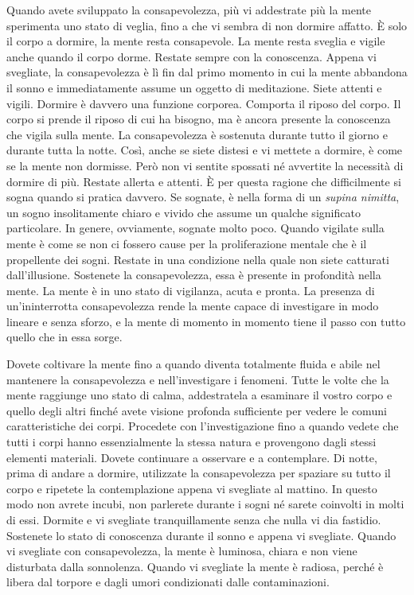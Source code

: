 Quando avete sviluppato la consapevolezza, più vi addestrate più la
mente sperimenta uno stato di veglia, fino a che vi sembra di non
dormire affatto. È solo il corpo a dormire, la mente resta consapevole.
La mente resta sveglia e vigile anche quando il corpo dorme. Restate
sempre con la conoscenza. Appena vi svegliate, la consapevolezza è lì
fin dal primo momento in cui la mente abbandona il sonno e
immediatamente assume un oggetto di meditazione. Siete attenti e vigili.
Dormire è davvero una funzione corporea. Comporta il riposo del corpo.
Il corpo si prende il riposo di cui ha bisogno, ma è ancora presente la
conoscenza che vigila sulla mente. La consapevolezza è sostenuta durante
tutto il giorno e durante tutta la notte. Così, anche se siete distesi e
vi mettete a dormire, è come se la mente non dormisse. Però non vi
sentite spossati né avvertite la necessità di dormire di più. Restate
allerta e attenti. È per questa ragione che difficilmente si sogna
quando si pratica davvero. Se sognate, è nella forma di un \emph{supina
nimitta}, un sogno insolitamente chiaro e vivido che assume un qualche
significato particolare. In genere, ovviamente, sognate molto poco.
Quando vigilate sulla mente è come se non ci fossero cause per la
proliferazione mentale che è il propellente dei sogni. Restate in una
condizione nella quale non siete catturati dall'illusione. Sostenete la
consapevolezza, essa è presente in profondità nella mente. La mente è in
uno stato di vigilanza, acuta e pronta. La presenza di un'ininterrotta
consapevolezza rende la mente capace di investigare in modo lineare e
senza sforzo, e la mente di momento in momento tiene il passo con tutto
quello che in essa sorge.

Dovete coltivare la mente fino a quando diventa totalmente fluida e
abile nel mantenere la consapevolezza e nell'investigare i fenomeni.
Tutte le volte che la mente raggiunge uno stato di calma, addestratela a
esaminare il vostro corpo e quello degli altri finché avete visione
profonda sufficiente per vedere le comuni caratteristiche dei corpi.
Procedete con l'investigazione fino a quando vedete che tutti i corpi
hanno essenzialmente la stessa natura e provengono dagli stessi elementi
materiali. Dovete continuare a osservare e a contemplare. Di notte,
prima di andare a dormire, utilizzate la consapevolezza per spaziare su
tutto il corpo e ripetete la contemplazione appena vi svegliate al
mattino. In questo modo non avrete incubi, non parlerete durante i sogni
né sarete coinvolti in molti di essi. Dormite e vi svegliate
tranquillamente senza che nulla vi dia fastidio. Sostenete lo stato di
conoscenza durante il sonno e appena vi svegliate. Quando vi svegliate
con consapevolezza, la mente è luminosa, chiara e non viene disturbata
dalla sonnolenza. Quando vi svegliate la mente è radiosa, perché è
libera dal torpore e dagli umori condizionati dalle contaminazioni.

